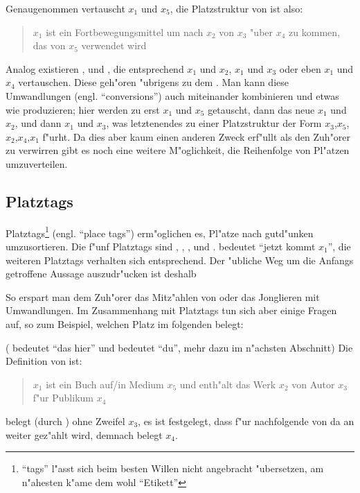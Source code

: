 Genaugenommen vertauscht  $x_1$ und $x_5$, die Platzstruktur von  ist also:
\begin{quote}
$x_1$ ist ein Fortbewegungsmittel um nach $x_2$ von $x_3$ "uber $x_4$ zu kommen, das von $x_5$ verwendet wird
\end{quote}

Analog existieren ,  und , die entsprechend $x_1$ und $x_2$, $x_1$ und $x_3$ oder eben $x_1$ und $x_4$ vertauschen. Diese  geh"oren "ubrigens
zu dem  .
Man kann diese Umwandlungen (engl. ``conversions'') auch miteinander kombinieren und etwas wie  produzieren; hier werden zu erst $x_1$ und $x_5$ getauscht, dann
das neue $x_1$ und $x_2$, und dann $x_1$ und $x_3$, was letztenendes zu einer Platzstruktur der Form $x_3$,$x_5$,$x_2$,$x_4$,$x_1$ f"urht.
Da dies aber kaum einen anderen Zweck erf"ullt als den Zuh"orer zu verwirren gibt es noch eine weitere M"oglichkeit, die Reihenfolge von Pl"atzen umzuverteilen.

\subsection{Platztags}
Platztags\footnote{``tags'' l"asst sich beim besten Willen nicht angebracht "ubersetzen, am n"ahesten k"ame dem wohl ``Etikett''} (engl. ``place tags'') erm"oglichen es, Pl"atze
nach gutd"unken umzusortieren. Die f"unf Platztags sind , , ,  und .  bedeutet ``jetzt kommt $x_1$'', die weiteren Platztags 
verhalten sich entsprechend.
Der "ubliche Weg um die Anfangs getroffene Aussage auszudr"ucken ist deshalb
\begin{quote}
\end{quote}
So erspart man dem Zuh"orer das Mitz"ahlen von  oder das Jonglieren mit Umwandlungen.
Im Zusammenhang mit Platztags tun sich aber einige Fragen auf, so zum Beispiel, welchen Platz  im folgenden  belegt:
\begin{quote}
\end{quote}
( bedeutet ``das hier'' und  bedeutet ``du'', mehr dazu im n"achsten Abschnitt)
Die Definition von  ist:
\begin{quote}
$x_1$ ist ein Buch auf/in Medium $x_5$ und enth"alt das Werk $x_2$ von Autor $x_3$ f"ur Publikum $x_4$
\end{quote}
 belegt (durch ) ohne Zweifel $x_3$, es ist festgelegt, dass f"ur nachfolgende  von da an weiter gez"ahlt wird, demnach belegt  $x_4$.

